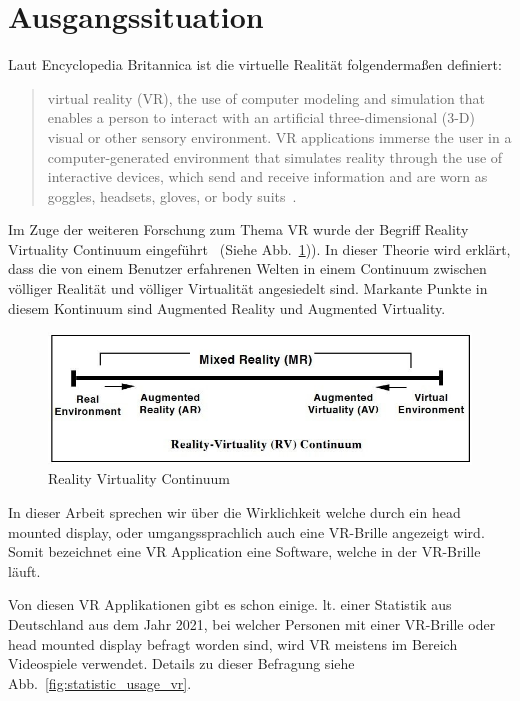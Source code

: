 \section{Ausgangssituation}
\label{sec: initial_situation}

Laut Encyclopedia Britannica ist die virtuelle Realität folgendermaßen definiert:
\begin{quotation}
    virtual reality (VR), the use of computer modeling and simulation that enables a person to interact with an artificial three-dimensional (3-D) visual or other sensory environment.
    VR applications immerse the user in a computer-generated environment that simulates reality through the use of interactive devices, which send and receive information and are worn as goggles, headsets, gloves, or body suits~\cite{LOWOOD_2021}.
\end{quotation}

Im Zuge der weiteren Forschung zum Thema VR wurde der Begriff Reality Virtuality Continuum eingeführt~\cite{MILGRAM_1994} (Siehe Abb.~\ref{fig:reality_virtuality_continuum})).
In dieser Theorie wird erklärt, dass die von einem Benutzer erfahrenen Welten in einem Continuum zwischen völliger Realität und völliger Virtualität angesiedelt sind.
Markante Punkte in diesem Kontinuum sind Augmented Reality und Augmented Virtuality.

\begin{figure}
    \centering
    \includegraphics[scale=0.5]{pics/reality_virtuality_continuum}
    \caption{Reality Virtuality Continuum}
    \label{fig:reality_virtuality_continuum}
\end{figure}

In dieser Arbeit sprechen wir über die Wirklichkeit welche durch ein head mounted display, oder umgangssprachlich auch eine VR-Brille angezeigt wird.
Somit bezeichnet eine VR Application eine Software, welche in der VR-Brille läuft.

Von diesen VR Applikationen gibt es schon einige.
lt. einer Statistik aus Deutschland aus dem Jahr 2021, bei welcher Personen mit einer VR-Brille oder head mounted display befragt worden sind, wird VR meistens im Bereich Videospiele verwendet.
Details zu dieser Befragung siehe Abb.~\ref{fig:statistic_usage_vr}.

